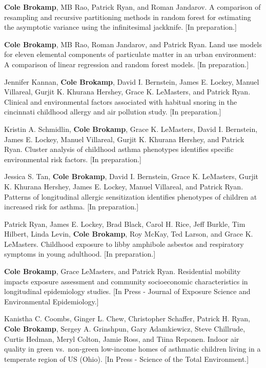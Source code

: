 
\textbf{Cole Brokamp}, MB Rao, Patrick Ryan, and Roman Jandarov. A
comparison of resampling and recursive partitioning methods in random
forest for estimating the asymptotic variance using the infinitesimal
jackknife. {[}In preparation.{]}

\textbf{Cole Brokamp}, MB Rao, Roman Jandarov, and Patrick Ryan. Land
use models for eleven elemental components of particulate matter in an
urban environment: A comparison of linear regression and random forest
models. {[}In preparation.{]}

Jennifer Kannan, \textbf{Cole Brokamp}, David I. Bernstein, James E.
Lockey, Manuel Villareal, Gurjit K. Khurana Hershey, Grace K. LeMasters,
and Patrick Ryan. Clinical and environmental factors associated with
habitual snoring in the cincinnati childhood allergy and air pollution
study. {[}In preparation.{]}

Kristin A. Schmidlin, \textbf{Cole Brokamp}, Grace K. LeMasters, David
I. Bernstein, James E. Lockey, Manuel Villareal, Gurjit K. Khurana
Hershey, and Patrick Ryan. Cluster analysis of childhood asthma
phenotypes identifies specific environmental risk factors. {[}In
preparation.{]}

Jessica S. Tan, \textbf{Cole Brokamp}, David I. Bernstein, Grace K.
LeMasters, Gurjit K. Khurana Hershey, James E. Lockey, Manuel Villareal,
and Patrick Ryan. Patterns of longitudinal allergic sensitization
identifies phenotypes of children at increased risk for asthma. {[}In
preparation.{]}

Patrick Ryan, James E. Lockey, Brad Black, Carol H. Rice, Jeff Burkle,
Tim Hilbert, Linda Levin, \textbf{Cole Brokamp}, Roy McKay, Ted Larson,
and Grace K. LeMasters. Childhood exposure to libby amphibole asbestos
and respiratory symptoms in young adulthood. {[}In preparation.{]}

\textbf{Cole Brokamp}, Grace LeMasters, and Patrick Ryan. Residential
mobility impacts exposure assessment and community socioeconomic
characteristics in longitudinal epidemiology studies. {[}In Press -
Journal of Exposure Science and Environmental Epidemiology.{]}

Kanistha C. Coombs, Ginger L. Chew, Christopher Schaffer, Patrick H.
Ryan, \textbf{Cole Brokamp}, Sergey A. Grinshpun, Gary Adamkiewicz,
Steve Chillrude, Curtis Hedman, Meryl Colton, Jamie Ross, and Tiina
Reponen. Indoor air quality in green vs.~non-green low-income homes of
asthmatic children living in a temperate region of US (Ohio). {[}In
Press - Science of the Total Environment.{]}

